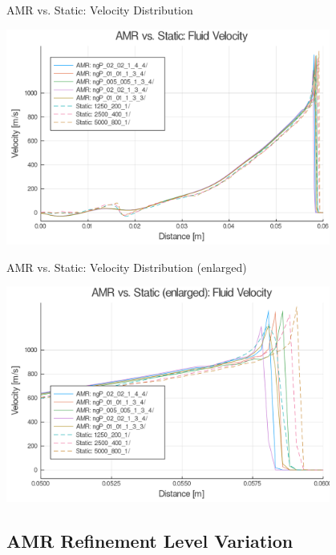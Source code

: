 \begin{frame}{AMR vs. Static: Velocity Distribution}
\begin{center}
\includegraphics[width=0.8\textwidth]{../figs/amrfigs/amrcompare/u.png}
\end{center}
\end{frame}

\begin{frame}{AMR vs. Static: Velocity Distribution (enlarged)}
\begin{center}
\includegraphics[width=0.8\textwidth]{../figs/amrfigs/amrcompare/ue.png}
\end{center}
\end{frame}


\subsection{AMR Refinement Level Variation}

